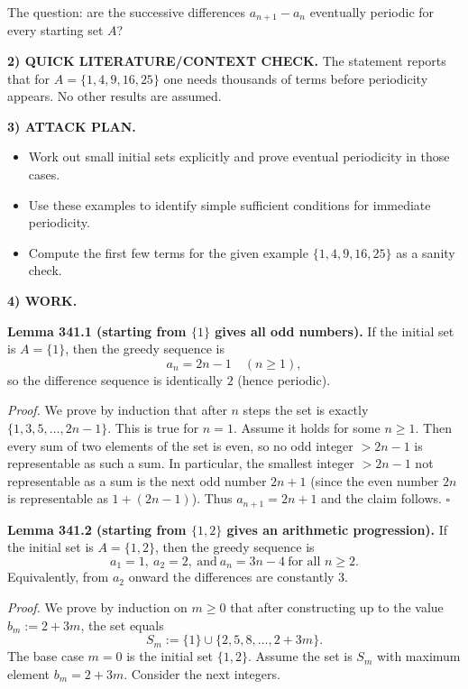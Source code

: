 The question: are the successive differences $a_{n+1}-a_n$ eventually periodic for every starting set $A$?

\medskip
\noindent\textbf{2) QUICK LITERATURE/CONTEXT CHECK.}
The statement reports that for $A=\{1,4,9,16,25\}$ one needs thousands of terms before periodicity appears. No other results are assumed.

\medskip
\noindent\textbf{3) ATTACK PLAN.}
\begin{itemize}
\item Work out small initial sets explicitly and prove eventual periodicity in those cases.
\item Use these examples to identify simple sufficient conditions for immediate periodicity.
\item Compute the first few terms for the given example $\{1,4,9,16,25\}$ as a sanity check.
\end{itemize}

\medskip
\noindent\textbf{4) WORK.}

\medskip
\noindent\textbf{Lemma 341.1 (starting from $\{1\}$ gives all odd numbers).}
If the initial set is $A=\{1\}$, then the greedy sequence is
\[
 a_n = 2n-1\quad(n\ge 1),
\]
so the difference sequence is identically $2$ (hence periodic).

\noindent\emph{Proof.}
We prove by induction that after $n$ steps the set is exactly $\{1,3,5,\dots,2n-1\}$.
This is true for $n=1$.
Assume it holds for some $n\ge 1$.
Then every sum of two elements of the set is even, so no odd integer $>2n-1$ is representable as such a sum.
In particular, the smallest integer $>2n-1$ not representable as a sum is the next odd number $2n+1$ (since the even number $2n$ is representable as $1+(2n-1)$).
Thus $a_{n+1}=2n+1$ and the claim follows.
\hfill$\square$

\medskip
\noindent\textbf{Lemma 341.2 (starting from $\{1,2\}$ gives an arithmetic progression).}
If the initial set is $A=\{1,2\}$, then the greedy sequence is
\[
 a_1=1,\ a_2=2,\ \text{and}\ a_n = 3n-4\ \text{for all }n\ge 2.
\]
Equivalently, from $a_2$ onward the differences are constantly $3$.

\noindent\emph{Proof.}
We prove by induction on $m\ge 0$ that after constructing up to the value $b_m:=2+3m$, the set equals
\[
 S_m:=\{1\}\cup\{2,5,8,\dots,2+3m\}.
\]
The base case $m=0$ is the initial set $\{1,2\}$.
Assume the set is $S_m$ with maximum element $b_m=2+3m$.
Consider the next integers.

